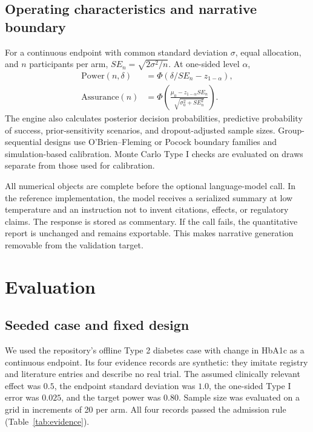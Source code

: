 \documentclass{article}
\begin{document}
\subsection{Operating characteristics and narrative boundary}

For a continuous endpoint with common standard deviation \(\sigma\), equal allocation, and \(n\) participants per arm, \(SE_n=\sqrt{2\sigma^2/n}\). At one-sided level \(\alpha\),
\begin{align*}
\mathrm{Power}(n,\delta)&=\Phi\left(\delta/SE_n-z_{1-\alpha}\right),\\
\mathrm{Assurance}(n)&=\Phi\left(
\frac{\mu_0-z_{1-\alpha}SE_n}{\sqrt{\sigma_0^2+SE_n^2}}
\right).
\end{align*}
The engine also calculates posterior decision probabilities, predictive probability of success, prior-sensitivity scenarios, and dropout-adjusted sample sizes. Group-sequential designs use O'Brien--Fleming or Pocock boundary families and simulation-based calibration. Monte Carlo Type I checks are evaluated on draws separate from those used for calibration.

All numerical objects are complete before the optional language-model call. In the reference implementation, the model receives a serialized summary at low temperature and an instruction not to invent citations, effects, or regulatory claims. The response is stored as commentary. If the call fails, the quantitative report is unchanged and remains exportable. This makes narrative generation removable from the validation target.

\section{Evaluation}

\subsection{Seeded case and fixed design}

We used the repository's offline Type 2 diabetes case with change in HbA1c as a continuous endpoint. Its four evidence records are synthetic: they imitate registry and literature entries and describe no real trial. The assumed clinically relevant effect was \(0.5\), the endpoint standard deviation was \(1.0\), the one-sided Type I error was \(0.025\), and the target power was \(0.80\). Sample size was evaluated on a grid in increments of 20 per arm. All four records passed the admission rule (Table~\ref{tab:evidence}).
\end{document}
